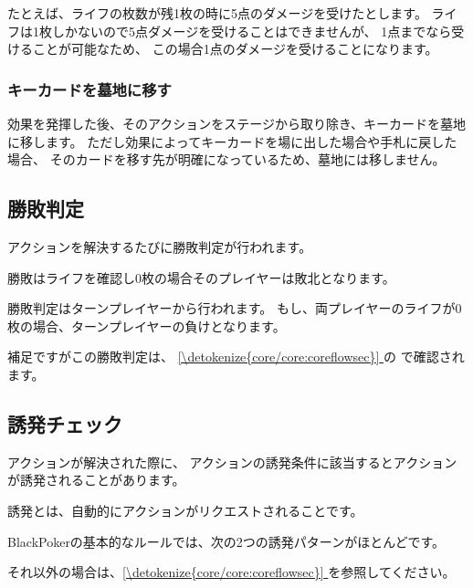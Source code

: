 \documentclass[letterpaper,10pt,dvipdfmx]{sphinxmanual}
\begin{document}
\sphinxAtStartPar
たとえば、ライフの枚数が残1枚の時に5点のダメージを受けたとします。
ライフは1枚しかないので5点ダメージを受けることはできませんが、
1点までなら受けることが可能なため、
この場合1点のダメージを受けることになります。


\subsubsection{キーカードを墓地に移す}
\label{\detokenize{common/common:keycard-gy}}\label{\detokenize{common/common:id31}}
\sphinxAtStartPar
効果を発揮した後、そのアクションをステージから取り除き、キーカードを墓地に移します。
ただし効果によってキーカードを場に出した場合や手札に戻した場合、
そのカードを移す先が明確になっているため、墓地には移しません。


\subsection{勝敗判定}
\label{\detokenize{common/common:id32}}
\sphinxAtStartPar
アクションを解決するたびに勝敗判定が行われます。

\sphinxAtStartPar
勝敗はライフを確認し0枚の場合そのプレイヤーは敗北となります。

\sphinxAtStartPar
勝敗判定はターンプレイヤーから行われます。
もし、両プレイヤーのライフが0枚の場合、ターンプレイヤーの負けとなります。

\sphinxAtStartPar
補足ですがこの勝敗判定は、 \hyperref[\detokenize{core/core:coreflowsec}]{\ref{\detokenize{core/core:coreflowsec}} } の {\hyperref[\detokenize{core/core:winlose}]{}} で確認されます。


\subsection{誘発チェック}
\label{\detokenize{common/common:id33}}
\sphinxAtStartPar
アクションが解決された際に、
アクションの誘発条件に該当するとアクションが誘発されることがあります。

\sphinxAtStartPar
誘発とは、自動的にアクションがリクエストされることです。

\sphinxAtStartPar
BlackPokerの基本的なルールでは、次の2つの誘発パターンがほとんどです。

\sphinxAtStartPar
それ以外の場合は、\hyperref[\detokenize{core/core:coreflowsec}]{\ref{\detokenize{core/core:coreflowsec}} } を参照してください。
\end{document}
